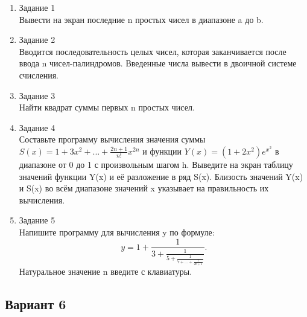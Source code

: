 \documentclass[a4paper]{article}
\begin{document}
	\begin{enumerate} 
		\item Задание 1 \\
			Вывести на экран последние n простых чисел в диапазоне a до b.\\
		\item Задание 2\\
			Вводится последовательность целых чисел, которая заканчивается после ввода n чисел-палиндромов.  
			Введенные числа вывести в двоичной системе счисления.\\
		\item Задание 3 \\
			Найти квадрат суммы первых n простых чисел.\\
		\item Задание 4 \\
			Составьте программу вычисления значения суммы  $S(x)=1+3x^2+...+\frac{2n+1}{n!}x^{2n}$
			и функции $Y(x)=(1+2x^2)e^{x^2}$ в диапазоне от 0 до 1
			с произвольным шагом h. Выведите на экран таблицу значений функции Y(x) и её разложение в ряд S(x). Близость значений Y(x) и S(x) во всём диапазоне
			значений x указывает на правильность их вычисления.\\
		\item Задание 5 \\
			Напишите программу для вычисления y по формуле:
			$$y=1+\frac{1}{3+\frac{1}{5+\frac{1}{7+...+\frac{1}{2n+1}}}}.$$
			Натуральное значение n введите с клавиатуры.\\
	\end{enumerate}
	
	\begin{center}
		\subsection*{Вариант 6}
	\end{center}
\end{document}
